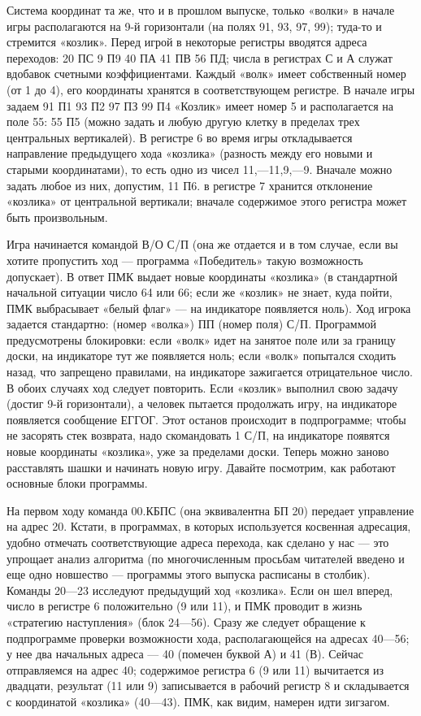 \documentclass[11pt,a4paper,oneside]{article}
\begin{document}
Система координат та же, что и в прошлом выпуске, только «волки» в начале игры располагаются на 9-й горизонтали (на полях 91, 93, 97, 99); туда-то и стремится «козлик». Перед игрой в некоторые регистры вводятся адреса переходов: 20 ПС 9 П9 40 ПА 41 ПВ 56 ПД; числа в регистрах С и А служат вдобавок счетными коэффициентами. Каждый «волк» имеет собственный номер (от 1 до 4), его координаты хранятся в соответствующем регистре. В начале игры задаем 91 П1 93 П2 97 ПЗ 99 П4 «Козлик» имеет номер 5 и располагается на поле 55: 55 П5 (можно задать и любую другую клетку в пределах трех центральных вертикалей). В регистре 6 во время игры откладывается направление предыдущего хода «козлика» (разность между его новыми и старыми координатами), то есть одно из чисел 11,—11,9,—9. Вначале можно задать любое из них, допустим, 11 П6. в регистре 7 хранится отклонение «козлика» от центральной вертикали; вначале содержимое этого регистра может быть произвольным.

Игра начинается командой В/О С/П (она же отдается и в том случае, если вы хотите пропустить ход — программа «Победитель» такую возможность допускает). В ответ ПМК выдает новые координаты «козлика» (в стандартной начальной ситуации число 64 или 66; если же «козлик» не знает, куда пойти, ПМК выбрасывает «белый флаг» — на индикаторе появляется ноль). Ход игрока задается стандартно: (номер «волка») ПП (номер поля) С/П. Программой предусмотрены блокировки: если «волк» идет на занятое поле или за границу доски, на индикаторе тут же появляется ноль; если «волк» попытался сходить назад, что запрещено правилами, на индикаторе зажигается отрицательное число. В обоих случаях ход следует повторить. Если «козлик» выполнил свою задачу (достиг 9-й горизонтали), а человек пытается продолжать игру, на индикаторе появляется сообщение ЕГГОГ. Этот останов происходит в подпрограмме; чтобы не засорять стек возврата, надо скомандовать 1 С/П, на индикаторе появятся новые координаты «козлика», уже за пределами доски. Теперь  можно заново расставлять шашки и начинать новую игру. Давайте посмотрим, как работают основные блоки программы.

На первом ходу команда 00.КБПС (она эквивалентна БП 20) передает управление на адрес 20. Кстати, в программах, в которых используется косвенная адресация, удобно отмечать соответствующие адреса перехода, как сделано у нас — это упрощает анализ алгоритма (по многочисленным просьбам читателей введено и еще одно новшество — программы этого выпуска расписаны в столбик). Команды 20—23 исследуют предыдущий ход «козлика». Если он шел вперед, число в регистре 6 положительно (9 или 11), и ПМК проводит в жизнь «стратегию наступления» (блок 24—56). Сразу же следует обращение к подпрограмме проверки возможности хода, располагающейся на адресах 40—56; у нее два начальных адреса — 40 (помечен буквой А) и 41 (В). Сейчас отправляемся на адрес 40; содержимое регистра 6 (9 или 11) вычитается из двадцати, результат (11 или 9) записывается в рабочий регистр 8 и складывается с координатой «козлика» (40—43). ПМК, как видим, намерен идти зигзагом.
\end{document}
